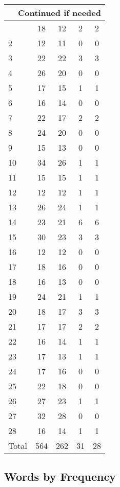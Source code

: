 \begin{center}
\begin{longtable}{l|c|c|c|c}
\hline \multicolumn{5}{|r|}{{Continued if needed}} \\ \hline
\endfoot 
1 & 18 & 12 & 2 & 2\\ \hline
2 & 12 & 11 & 0 & 0\\ \hline
3 & 22 & 22 & 3 & 3\\ \hline
4 & 26 & 20 & 0 & 0\\ \hline
5 & 17 & 15 & 1 & 1\\ \hline
6 & 16 & 14 & 0 & 0\\ \hline
7 & 22 & 17 & 2 & 2\\ \hline
8 & 24 & 20 & 0 & 0\\ \hline
9 & 15 & 13 & 0 & 0\\ \hline
10 & 34 & 26 & 1 & 1\\ \hline
11 & 15 & 15 & 1 & 1\\ \hline
12 & 12 & 12 & 1 & 1\\ \hline
13 & 26 & 24 & 1 & 1\\ \hline
14 & 23 & 21 & 6 & 6\\ \hline
15 & 30 & 23 & 3 & 3\\ \hline
16 & 12 & 12 & 0 & 0\\ \hline
17 & 18 & 16 & 0 & 0\\ \hline
18 & 16 & 13 & 0 & 0\\ \hline
19 & 24 & 21 & 1 & 1\\ \hline
20 & 18 & 17 & 3 & 3\\ \hline
21 & 17 & 17 & 2 & 2\\ \hline
22 & 16 & 14 & 1 & 1\\ \hline
23 & 17 & 13 & 1 & 1\\ \hline
24 & 17 & 16 & 0 & 0\\ \hline
25 & 22 & 18 & 0 & 0\\ \hline
26 & 27 & 23 & 1 & 1\\ \hline
27 & 32 & 28 & 0 & 0\\ \hline
28 & 16 & 14 & 1 & 1\\ \hline
\hline \hline
Total & 564 & 262 & 31 & 28



\end{longtable}
\end{center}

 
\subsection{Words by Frequency}

